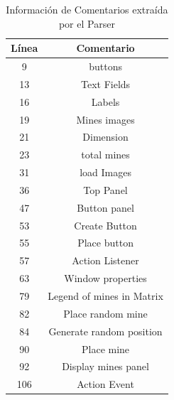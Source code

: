 \documentclass[a4paper,12pt]{report}
\begin{document}
\begin{table}[h!]
	
		\centering
   		\begin{tabular}{| c | c |}      
       \hline
  	   \textsf{Línea} & \textsf{Comentario} \\ \hline
9&buttons \\ \hline
13&Text Fields \\ \hline
16&Labels \\ \hline
19&Mines images \\ \hline
21&Dimension \\ \hline
23&total mines \\ \hline
31&load Images \\ \hline
36&Top Panel \\ \hline
47&Button panel \\ \hline
53&Create Button \\ \hline
55&Place button \\ \hline
57&Action Listener \\ \hline
63&Window properties \\ \hline
79&Legend of mines in Matrix \\ \hline
82&Place random mine \\ \hline
84&Generate random position \\ \hline
90&Place mine \\ \hline
92&Display mines panel \\ \hline
106&Action Event \\ \hline
 	   
  \end{tabular}  
	 
   \caption{Información de Comentarios extraída por el Parser}
   \label{tabla4}
     
\end{table} 
\end{document}
